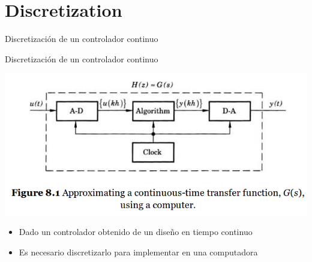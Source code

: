 \documentclass[presentation,aspectratio=1610]{beamer}
\begin{document}
\section{Discretization}
\label{sec:org422aac7}
\begin{frame}[label={sec:orgefb03e0}]{Discretización de un controlador continuo}
\end{frame}
\begin{frame}[label={sec:org6a8891a}]{Discretización de un controlador continuo}
\begin{center}
\includegraphics[width=0.7\linewidth]{../../figures/fig8-1.png}
\end{center}

\begin{itemize}
\item Dado un controlador obtenido de un diseño en tiempo continuo
\item Es necesario discretizarlo para implementar en una computadora
\end{itemize}
\end{frame}
\end{document}
